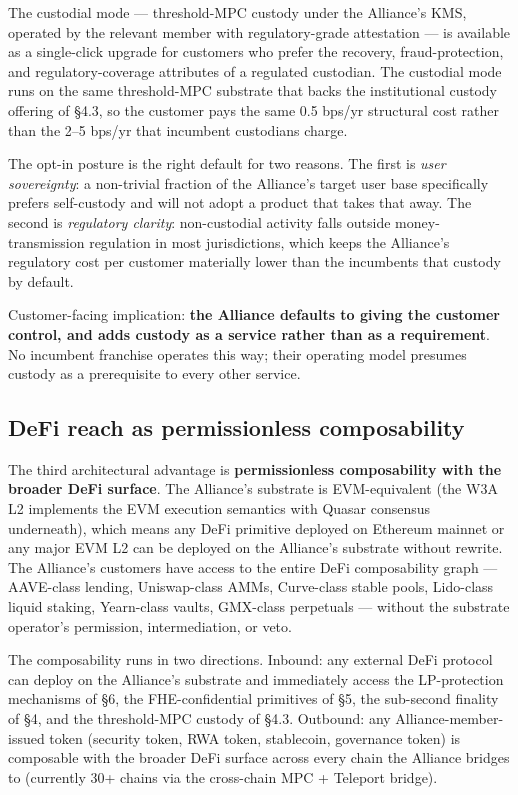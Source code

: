 The custodial mode --- threshold-MPC custody under the Alliance's KMS,
operated by the relevant member with regulatory-grade attestation ---
is available as a single-click upgrade for customers who prefer the
recovery, fraud-protection, and regulatory-coverage attributes of a
regulated custodian. The custodial mode runs on the same threshold-MPC
substrate that backs the institutional custody offering of \S 4.3, so
the customer pays the same 0.5 bps/yr structural cost rather than the
2--5 bps/yr that incumbent custodians charge.

The opt-in posture is the right default for two reasons. The first is
\emph{user sovereignty}: a non-trivial fraction of the Alliance's
target user base specifically prefers self-custody and will not adopt a
product that takes that away. The second is \emph{regulatory clarity}:
non-custodial activity falls outside money-transmission regulation in
most jurisdictions, which keeps the Alliance's regulatory cost per
customer materially lower than the incumbents that custody by default.

Customer-facing implication: \textbf{the Alliance defaults to giving
the customer control, and adds custody as a service rather than as a
requirement}. No incumbent franchise operates this way; their
operating model presumes custody as a prerequisite to every other
service.

\subsection{DeFi reach as permissionless composability}

The third architectural advantage is \textbf{permissionless
composability with the broader DeFi surface}. The Alliance's substrate
is EVM-equivalent (the W3A L2 implements the EVM execution semantics
with Quasar consensus underneath), which means any DeFi primitive
deployed on Ethereum mainnet or any major EVM L2 can be deployed on
the Alliance's substrate without rewrite. The Alliance's customers
have access to the entire DeFi composability graph --- AAVE-class
lending, Uniswap-class AMMs, Curve-class stable pools, Lido-class
liquid staking, Yearn-class vaults, GMX-class perpetuals --- without
the substrate operator's permission, intermediation, or veto.

The composability runs in two directions. Inbound: any external DeFi
protocol can deploy on the Alliance's substrate and immediately access
the LP-protection mechanisms of \S 6, the FHE-confidential primitives
of \S 5, the sub-second finality of \S 4, and the threshold-MPC
custody of \S 4.3. Outbound: any Alliance-member-issued token (security
token, RWA token, stablecoin, governance token) is composable with
the broader DeFi surface across every chain the Alliance bridges to
(currently 30+ chains via the cross-chain MPC + Teleport bridge).

